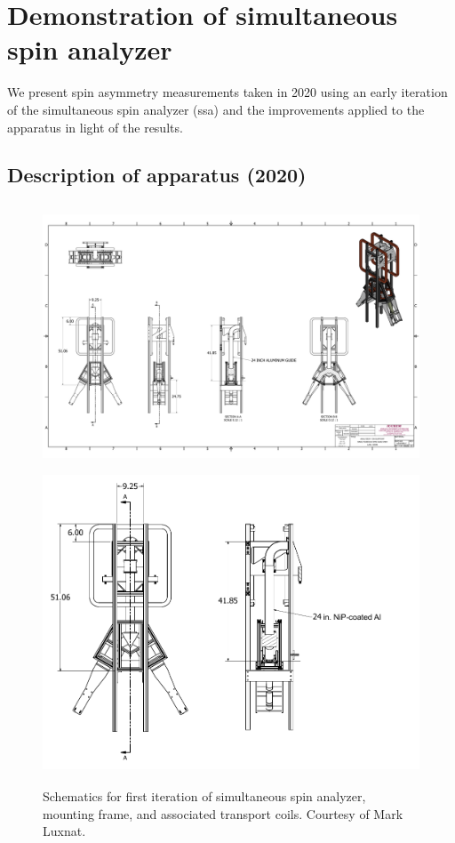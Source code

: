 
\chapter{Demonstration of simultaneous spin analyzer}\label{chap:ssa_2020}


We present spin asymmetry measurements taken in 2020 using an early iteration of the simultaneous spin analyzer (\acrshort{ssa}) and the improvements applied to the apparatus in light of the results.


\section{Description of apparatus (2020)}


\begin{figure}[hbp]
    \centering
    \includegraphics[height=3.1in]{figures/ssa_schematic_colorized.pdf}
    \includegraphics[height=3.5in]{figures/ssa_schematics.pdf}
    \caption
    {Schematics for first iteration of simultaneous spin analyzer, mounting frame, and associated transport coils. Courtesy of Mark Luxnat.}
    \label{fig:ssa_schematic}
\end{figure}

